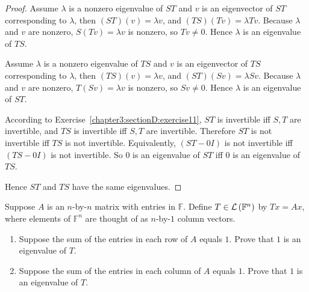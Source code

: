 \begin{proof}
    Assume $\lambda$ is a nonzero eigenvalue of $ST$ and $v$ is an eigenvector of $ST$ corresponding to $\lambda$, then $(ST)(v) = \lambda v$, and $(TS)(Tv) = \lambda Tv$. Because $\lambda$ and $v$ are nonzero, $S(Tv) = \lambda v$ is nonzero, so $Tv\ne 0$. Hence $\lambda$ is an eigenvalue of $TS$.

    Assume $\lambda$ is a nonzero eigenvalue of $TS$ and $v$ is an eigenvector of $TS$ corresponding to $\lambda$, then $(TS)(v) = \lambda v$, and $(ST)(Sv) = \lambda Sv$. Because $\lambda$ and $v$ are nonzero, $T(Sv) = \lambda v$ is nonzero, so $Sv\ne 0$. Hence $\lambda$ is an eigenvalue of $ST$.

    According to Exercise~\ref{chapter3:sectionD:exercise11}, $ST$ is invertible iff $S, T$ are invertible, and $TS$ is invertible iff $S, T$ are invertible. Therefore $ST$ is not invertible iff $TS$ is not invertible. Equivalently, $(ST - 0I)$ is not invertible iff $(TS - 0I)$ is not invertible. So $0$ is an eigenvalue of $ST$ iff $0$ is an eigenvalue of $TS$.

    Hence $ST$ and $TS$ have the same eigenvalues.
\end{proof}
\newpage

\begin{exercise}
    Suppose $A$ is an $n$-by-$n$ matrix with entries in $\mathbb{F}$. Define $T\in\mathcal{L}\left({\mathbb{F}^{n}}\right)$ by $Tx = Ax$, where elements of $\mathbb{F}^{n}$ are thought of as $n$-by-$1$ column vectors.
    \begin{enumerate}[label={(\alph*)}]
        \item Suppose the sum of the entries in each row of $A$ equals $1$. Prove that $1$ is an eigenvalue of $T$.
        \item Suppose the sum of the entries in each column of $A$ equals $1$. Prove that $1$ is an eigenvalue of $T$.
    \end{enumerate}
\end{exercise}

